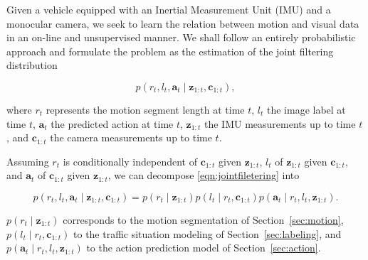 Given a vehicle equipped with an Inertial Measurement Unit (IMU) and a monocular
camera, we seek to learn the relation between motion and visual data in an
on-line and unsupervised manner. We shall follow an entirely probabilistic
approach and formulate the problem as the estimation of the joint filtering
distribution

\begin{equation}
\label{eqn:jointfiletering}
p(r_t,l_t,\mathbf{a}_t\mid\mathbf{z}_{1:t},\mathbf{c}_{1:t}),
\end{equation}

where $r_t$ represents the motion segment length at time $t$, $l_t$ the image
label at time $t$, $\mathbf{a}_t$ the predicted action at time $t$,
$\mathbf{z}_{1:t}$ the IMU measurements up to time $t$, and $\mathbf{c}_{1:t}$
the camera measurements up to time $t$.

Assuming $r_t$ is conditionally independent of $\mathbf{c}_{1:t}$ given
$\mathbf{z}_{1:t}$, $l_t$ of $\mathbf{z}_{1:t}$ given $\mathbf{c}_{1:t}$, and
$\mathbf{a}_t$ of $\mathbf{c}_{1:t}$ given $\mathbf{z}_{1:t}$, we can decompose
\eqref{eqn:jointfiletering} into

\begin{equation}
\label{eqn:jointdecomposition}
p(r_t,l_t,\mathbf{a}_t\mid\mathbf{z}_{1:t},\mathbf{c}_{1:t})=
p(r_t\mid\mathbf{z}_{1:t})p(l_t\mid r_t,\mathbf{c}_{1:t})
p(\mathbf{a}_t\mid r_t,l_t,\mathbf{z}_{1:t}).
\end{equation}

$p(r_t\mid\mathbf{z}_{1:t})$ corresponds to the motion segmentation of
Section~\ref{sec:motion}, $p(l_t\mid r_t,\mathbf{c}_{1:t})$ to the traffic
situation modeling of Section~\ref{sec:labeling}, and $p(\mathbf{a}_t\mid
r_t,l_t,\mathbf{z}_{1:t})$ to the action prediction model of
Section~\ref{sec:action}.
